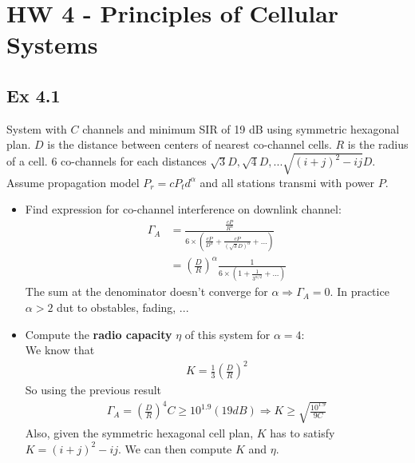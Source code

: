 \section*{HW 4 - Principles of Cellular Systems}

\subsection*{Ex 4.1}
System with $C$ channels and minimum SIR of 19 dB using symmetric hexagonal plan. $D$ is the distance between centers of nearest co-channel cells. $R$ is the radius of a cell. 6 co-channels for each distances $\sqrt{3} D, \sqrt{4}D, ... \sqrt{(i+j)^2 - ij} D$. Assume propagation model $P_r = c P_t d^{\alpha}$ and all stations transmi with power $P$.
\begin{itemize}
	\item Find expression for co-channel interference on downlink channel: \\
	\begin{align*}
		\Gamma_A    &= \frac{\frac{cP}{R^{\alpha}}}{6 \times (\frac{cP}{D^{\alpha}} + \frac{cP}{(\sqrt{3}D)^{\alpha}} + ...)} \\
					&= \left( \frac{D}{R}\right)^{\alpha} \frac{1}{6 \times (1 + \frac{1}{3^{\alpha/2}} + ... )}
	\end{align*}
	The sum at the denominator doesn't converge for $\alpha \Rightarrow \Gamma_A = 0$. In practice $\alpha > 2$ dut to obstables, fading, ...

	\item Compute the \textbf{radio capacity} $\eta$ of this system for $\alpha = 4$: \\
	We know that 
	\begin{align*}
		K = \frac{1}{3} (\frac{D}{R})^2
	\end{align*}
	So using the previous result
	\begin{align*}
		\Gamma_A = \left( \frac{D}{R}\right)^4 C \geq 10^{1.9} (19 dB) \Rightarrow K \geq \sqrt{\frac{10^{1.9}}{9 C}} 
	\end{align*}
	Also, given the symmetric hexagonal cell plan, $K$ has to satisfy $K = (i+j)^2 - ij$. We can then compute $K$ and $\eta$. 
\end{itemize}

